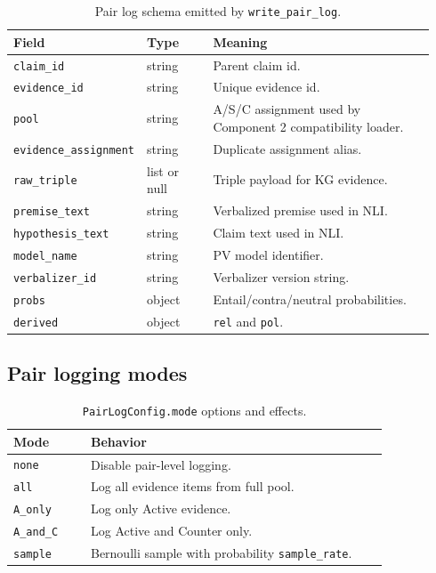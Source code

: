 \begin{table}[H]
\centering
\begin{tabular}{@{}p{0.24\linewidth}p{0.16\linewidth}p{0.54\linewidth}@{}}
\toprule
Field & Type & Meaning \\
\midrule
\texttt{claim\_id} & string & Parent claim id. \\
\texttt{evidence\_id} & string & Unique evidence id. \\
\texttt{pool} & string & A/S/C assignment used by Component 2 compatibility loader. \\
\texttt{evidence\_assignment} & string & Duplicate assignment alias. \\
\texttt{raw\_triple} & list or null & Triple payload for KG evidence. \\
\texttt{premise\_text} & string & Verbalized premise used in NLI. \\
\texttt{hypothesis\_text} & string & Claim text used in NLI. \\
\texttt{model\_name} & string & PV model identifier. \\
\texttt{verbalizer\_id} & string & Verbalizer version string. \\
\texttt{probs} & object & Entail/contra/neutral probabilities. \\
\texttt{derived} & object & \texttt{rel} and \texttt{pol}. \\
\bottomrule
\end{tabular}
\caption{Pair log schema emitted by \texttt{write\_pair\_log}.}
\label{tab:c1_pair_log_schema}
\end{table}

\subsection{Pair logging modes}
\begin{table}[H]
\centering
\begin{tabular}{@{}p{0.19\linewidth}p{0.73\linewidth}@{}}
\toprule
Mode & Behavior \\
\midrule
\texttt{none} & Disable pair-level logging. \\
\texttt{all} & Log all evidence items from full pool. \\
\texttt{A\_only} & Log only Active evidence. \\
\texttt{A\_and\_C} & Log Active and Counter only. \\
\texttt{sample} & Bernoulli sample with probability \texttt{sample\_rate}. \\
\bottomrule
\end{tabular}
\caption{\texttt{PairLogConfig.mode} options and effects.}
\label{tab:c1_pair_modes}
\end{table}

